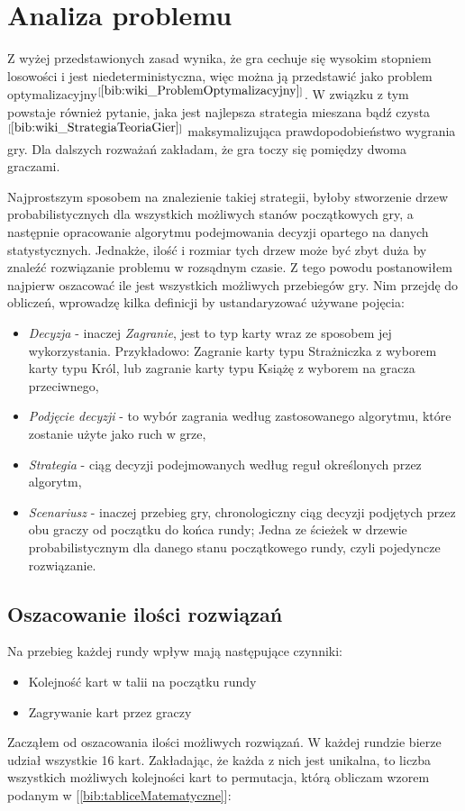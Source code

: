\section{Analiza problemu}
\label{sec:opisProblemu}
Z wyżej przedstawionych zasad wynika, że gra cechuje się wysokim stopniem losowości i jest niedeterministyczna, więc można ją przedstawić jako problem optymalizacyjny$^{[\ref{bib:wiki_ProblemOptymalizacyjny}]}$. W związku z tym powstaje również pytanie, jaka jest najlepsza strategia mieszana bądź czysta$^{[\ref{bib:wiki_StrategiaTeoriaGier}]}$ maksymalizująca prawdopodobieństwo wygrania gry. Dla dalszych rozważań zakładam, że gra toczy się pomiędzy dwoma graczami.

Najprostszym sposobem na znalezienie takiej strategii, byłoby stworzenie drzew probabilistycznych dla wszystkich możliwych stanów początkowych gry, a następnie opracowanie algorytmu podejmowania decyzji opartego na danych statystycznych. Jednakże, ilość i rozmiar tych drzew może być zbyt duża by znaleźć rozwiązanie problemu w rozsądnym czasie. Z tego powodu postanowiłem najpierw oszacować ile jest wszystkich możliwych przebiegów gry. Nim przejdę do obliczeń, wprowadzę kilka definicji by ustandaryzować używane pojęcia:
\begin{itemize}
	\item \textit{Decyzja} - inaczej \textit{Zagranie}, jest to typ karty wraz ze sposobem jej wykorzystania. Przykładowo: Zagranie karty typu Strażniczka z wyborem karty typu Król, lub zagranie karty typu Książę z wyborem na gracza przeciwnego,
	\item \textit{Podjęcie decyzji} - to wybór zagrania według zastosowanego algorytmu, które zostanie użyte jako ruch w grze,
	\item \textit{Strategia} - ciąg decyzji podejmowanych według reguł określonych przez algorytm,
	\item \textit{Scenariusz} - inaczej przebieg gry, chronologiczny ciąg decyzji podjętych przez obu graczy od początku do końca rundy; Jedna ze ścieżek w drzewie probabilistycznym dla danego stanu początkowego rundy, czyli pojedyncze rozwiązanie.
\end{itemize}

\subsection*{Oszacowanie ilości rozwiązań}
Na przebieg każdej rundy wpływ mają następujące czynniki:
\begin{itemize}
	\item Kolejność kart w talii na początku rundy
	\item Zagrywanie kart przez graczy
\end{itemize}
Zacząłem od oszacowania ilości możliwych rozwiązań. W każdej rundzie bierze udział wszystkie 16 kart. Zakładając, że każda z nich jest unikalna, to  liczba wszystkich możliwych kolejności kart to permutacja, którą obliczam wzorem podanym w [\ref{bib:tabliceMatematyczne}]:


